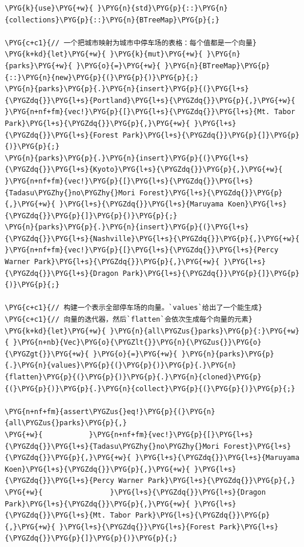 \begin{Verbatim}[commandchars=\\\{\},breaklines=true,breakanywhere=true,fontsize=\codefont,xleftmargin=17bp]
\PYG{k}{use}\PYG{+w}{ }\PYG{n}{std}\PYG{p}{::}\PYG{n}{collections}\PYG{p}{::}\PYG{n}{BTreeMap}\PYG{p}{;}

\PYG{c+c1}{// 一个把城市映射为城市中停车场的表格：每个值都是一个向量}
\PYG{k+kd}{let}\PYG{+w}{ }\PYG{k}{mut}\PYG{+w}{ }\PYG{n}{parks}\PYG{+w}{ }\PYG{o}{=}\PYG{+w}{ }\PYG{n}{BTreeMap}\PYG{p}{::}\PYG{n}{new}\PYG{p}{(}\PYG{p}{)}\PYG{p}{;}
\PYG{n}{parks}\PYG{p}{.}\PYG{n}{insert}\PYG{p}{(}\PYG{l+s}{\PYGZdq{}}\PYG{l+s}{Portland}\PYG{l+s}{\PYGZdq{}}\PYG{p}{,}\PYG{+w}{  }\PYG{n+nf+fm}{vec!}\PYG{p}{[}\PYG{l+s}{\PYGZdq{}}\PYG{l+s}{Mt. Tabor Park}\PYG{l+s}{\PYGZdq{}}\PYG{p}{,}\PYG{+w}{ }\PYG{l+s}{\PYGZdq{}}\PYG{l+s}{Forest Park}\PYG{l+s}{\PYGZdq{}}\PYG{p}{]}\PYG{p}{)}\PYG{p}{;}
\PYG{n}{parks}\PYG{p}{.}\PYG{n}{insert}\PYG{p}{(}\PYG{l+s}{\PYGZdq{}}\PYG{l+s}{Kyoto}\PYG{l+s}{\PYGZdq{}}\PYG{p}{,}\PYG{+w}{     }\PYG{n+nf+fm}{vec!}\PYG{p}{[}\PYG{l+s}{\PYGZdq{}}\PYG{l+s}{Tadasu\PYGZhy{}no\PYGZhy{}Mori Forest}\PYG{l+s}{\PYGZdq{}}\PYG{p}{,}\PYG{+w}{ }\PYG{l+s}{\PYGZdq{}}\PYG{l+s}{Maruyama Koen}\PYG{l+s}{\PYGZdq{}}\PYG{p}{]}\PYG{p}{)}\PYG{p}{;}
\PYG{n}{parks}\PYG{p}{.}\PYG{n}{insert}\PYG{p}{(}\PYG{l+s}{\PYGZdq{}}\PYG{l+s}{Nashville}\PYG{l+s}{\PYGZdq{}}\PYG{p}{,}\PYG{+w}{ }\PYG{n+nf+fm}{vec!}\PYG{p}{[}\PYG{l+s}{\PYGZdq{}}\PYG{l+s}{Percy Warner Park}\PYG{l+s}{\PYGZdq{}}\PYG{p}{,}\PYG{+w}{ }\PYG{l+s}{\PYGZdq{}}\PYG{l+s}{Dragon Park}\PYG{l+s}{\PYGZdq{}}\PYG{p}{]}\PYG{p}{)}\PYG{p}{;}

\PYG{c+c1}{// 构建一个表示全部停车场的向量。`values`给出了一个能生成}
\PYG{c+c1}{// 向量的迭代器，然后`flatten`会依次生成每个向量的元素}
\PYG{k+kd}{let}\PYG{+w}{ }\PYG{n}{all\PYGZus{}parks}\PYG{p}{:}\PYG{+w}{ }\PYG{n+nb}{Vec}\PYG{o}{\PYGZlt{}}\PYG{n}{\PYGZus{}}\PYG{o}{\PYGZgt{}}\PYG{+w}{ }\PYG{o}{=}\PYG{+w}{ }\PYG{n}{parks}\PYG{p}{.}\PYG{n}{values}\PYG{p}{(}\PYG{p}{)}\PYG{p}{.}\PYG{n}{flatten}\PYG{p}{(}\PYG{p}{)}\PYG{p}{.}\PYG{n}{cloned}\PYG{p}{(}\PYG{p}{)}\PYG{p}{.}\PYG{n}{collect}\PYG{p}{(}\PYG{p}{)}\PYG{p}{;}

\PYG{n+nf+fm}{assert\PYGZus{}eq!}\PYG{p}{(}\PYG{n}{all\PYGZus{}parks}\PYG{p}{,}
\PYG{+w}{           }\PYG{n+nf+fm}{vec!}\PYG{p}{[}\PYG{l+s}{\PYGZdq{}}\PYG{l+s}{Tadasu\PYGZhy{}no\PYGZhy{}Mori Forest}\PYG{l+s}{\PYGZdq{}}\PYG{p}{,}\PYG{+w}{ }\PYG{l+s}{\PYGZdq{}}\PYG{l+s}{Maruyama Koen}\PYG{l+s}{\PYGZdq{}}\PYG{p}{,}\PYG{+w}{ }\PYG{l+s}{\PYGZdq{}}\PYG{l+s}{Percy Warner Park}\PYG{l+s}{\PYGZdq{}}\PYG{p}{,}
\PYG{+w}{                }\PYG{l+s}{\PYGZdq{}}\PYG{l+s}{Dragon Park}\PYG{l+s}{\PYGZdq{}}\PYG{p}{,}\PYG{+w}{ }\PYG{l+s}{\PYGZdq{}}\PYG{l+s}{Mt. Tabor Park}\PYG{l+s}{\PYGZdq{}}\PYG{p}{,}\PYG{+w}{ }\PYG{l+s}{\PYGZdq{}}\PYG{l+s}{Forest Park}\PYG{l+s}{\PYGZdq{}}\PYG{p}{]}\PYG{p}{)}\PYG{p}{;}
\end{Verbatim}

